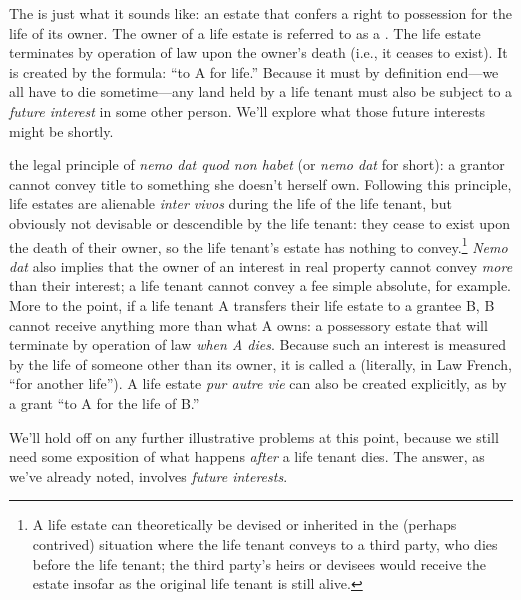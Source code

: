 The  is just what it sounds like: an estate that confers a
right to possession for the life of its owner. The owner of a life estate is
referred to as a . The life estate terminates by operation
of law upon the owner's death (i.e., it ceases to exist). It is created by the
formula: ``to A for life.'' Because it must by definition end---we all have to
die sometime---any land held by a life tenant must also be subject to a
\textit{future interest} in some other person. We'll explore what those future
interests might be shortly.

the legal principle of \textit{nemo dat quod non habet} (or \textit{nemo dat}
for short):
a grantor cannot convey title to something she doesn't herself own.
Following this principle, life estates are alienable \textit{inter vivos}
during the life of the life tenant, but obviously not devisable or
descendible by the life tenant: they cease to exist upon the death of their
owner, so the life
tenant's estate has nothing to convey.\footnote{A life estate can theoretically
be devised or inherited in the (perhaps contrived) situation where the life
tenant conveys to a third party, who dies before the life tenant; the third
party's heirs or devisees would receive the estate insofar as the original life
tenant is still alive.}
\textit{Nemo dat} also implies that the
owner of an interest in real property cannot convey \textit{more} than their
interest; a life tenant cannot convey a fee simple absolute, for example. More
to the point, if a life tenant A transfers their life estate to a grantee B, B
cannot receive anything more than what A owns: a possessory estate that will
terminate by operation of law \textit{when A dies}. Because such an interest is
measured by the life of someone other than its owner, it is called a
 (literally, in Law French, ``for another
life''). A life estate \textit{pur autre vie} can also be created explicitly,
as by a grant ``to A for the life of B.''

We'll hold off on any further illustrative problems at this point, because we
still need some exposition of what happens \textit{after} a life tenant dies.
The answer, as we've already noted, involves \textit{future interests}.

